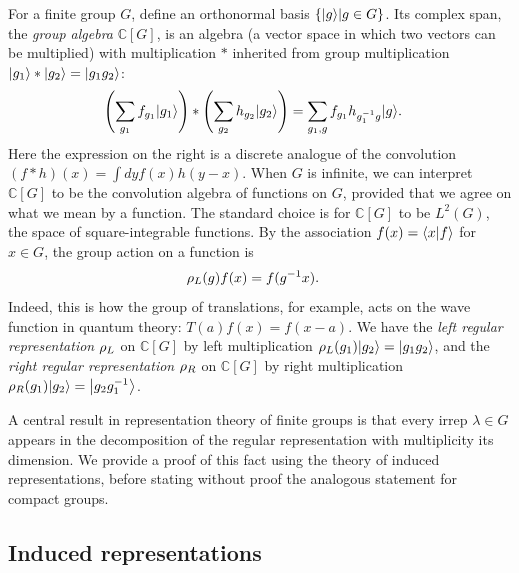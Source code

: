 For a finite group $G$, define an orthonormal basis $\{{\left\vert{g}\right\rangle}|g\in G\}$. Its complex span, the \emph{group algebra} $\mathbb{C}[G]$, is an algebra (a vector space in which two vectors can be multiplied) with multiplication $*$ inherited from group multiplication ${\left\vert{g_1}\right\rangle}*{\left\vert{g_2}\right\rangle} = {\left\vert{g_1g_2}\right\rangle}$:
\begin{align}
\left( \sum_{g_1} f_{g_1} {\left\vert{g_1}\right\rangle} \right) * \left( \sum_{g_2} h_{g_2} {\left\vert{g_2}\right\rangle} \right)
&= \sum_{g_1,g} f_{g_1} h_{g_1^{-1} g} {\left\vert{g}\right\rangle}.
\end{align}
Here the expression on the right is a discrete analogue of the convolution $(f*h)(x) = \int dy f(x)h(y-x)$. 
When $G$ is infinite, we can interpret $\mathbb{C}[G]$ to be the convolution algebra of functions on $G$, provided that we agree on what we mean by a function. The standard choice is for $\mathbb{C}[G]$ to be $L^2(G)$, the space of square-integrable functions. 
By the association $f(x) = \braket{x|f}$ for $x \in G$, the group action on a function is
\begin{align}
	\rho_L(g)f(x) &= f(g^{-1} x).
\end{align}
Indeed, this is how the group of translations, for example, acts on the wave function in quantum theory: $T(a)f(x) = f(x-a)$. We have the \emph{left regular representation} $\rho_L$ on $\mathbb{C}[G]$ by left multiplication $\rho_L(g_1) {\left\vert{g_2}\right\rangle} = {\left\vert{g_1 g_2}\right\rangle}$, and the \emph{right regular representation} $\rho_R$ on $\mathbb{C}[G]$ by right multiplication $\rho_R(g_1){\left\vert{g_2}\right\rangle} = {\left\vert{g_2 g_1^{-1}}\right\rangle}$.

A central result in representation theory of finite groups is that every irrep $\lambda \in \hat{G}$ appears in the decomposition of the regular representation with multiplicity its dimension. We provide a proof of this fact using the theory of induced representations, before stating without proof the analogous statement for compact groups. 


\subsection{Induced representations}\label{ch2:induced}

